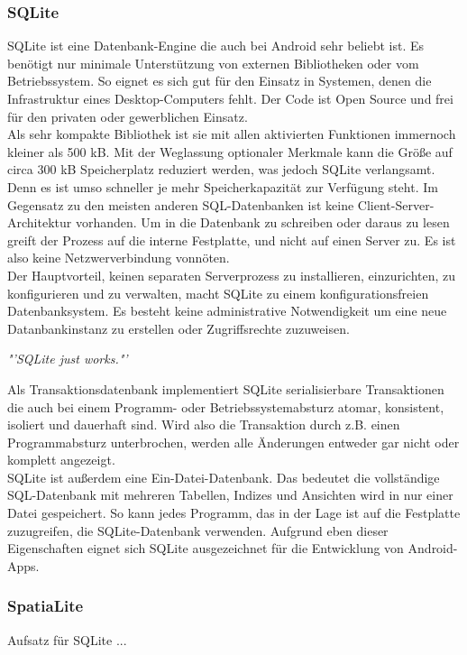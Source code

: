 \subsubsection{SQLite}
SQLite ist eine Datenbank-Engine die auch bei Android sehr beliebt ist. Es benötigt nur minimale Unterstützung von externen Bibliotheken oder vom Betriebssystem. So eignet es sich gut für den Einsatz in Systemen, denen die Infrastruktur eines Desktop-Computers fehlt. Der Code ist Open Source und frei für den privaten oder gewerblichen Einsatz.\\
Als sehr kompakte Bibliothek ist sie mit allen aktivierten Funktionen immernoch kleiner als 500 kB. Mit der Weglassung optionaler Merkmale kann die Größe auf circa 300 kB Speicherplatz reduziert werden, was jedoch SQLite verlangsamt. Denn es ist umso schneller je mehr Speicherkapazität zur Verfügung steht.
Im Gegensatz zu den meisten anderen \gls{SQL}-Datenbanken ist keine Client-Server-Architektur vorhanden. Um in die Datenbank zu schreiben oder daraus zu lesen greift der Prozess auf die interne Festplatte, und nicht auf einen Server zu. Es ist also keine Netzwerverbindung vonnöten. \\
Der Hauptvorteil, keinen separaten Serverprozess zu installieren, einzurichten, zu konfigurieren und zu verwalten, macht SQLite zu einem konfigurationsfreien Datenbanksystem. Es besteht keine administrative Notwendigkeit um eine neue Datanbankinstanz zu erstellen oder Zugriffsrechte zuzuweisen. 
\begin{center}
\textit{\color{gray}"'SQLite just works."'}\hspace{9pt}\cite{sqlitea}
\end{center}
Als Transaktionsdatenbank implementiert SQLite serialisierbare Transaktionen die auch bei einem Programm- oder Betriebssystemabsturz atomar, konsistent, isoliert und dauerhaft sind. Wird also die Transaktion durch z.B. einen Programmabsturz unterbrochen, werden alle Änderungen entweder gar nicht oder komplett angezeigt.\\ 
SQLite ist außerdem eine Ein-Datei-Datenbank. Das bedeutet die vollständige \gls{SQL}-Datenbank mit mehreren Tabellen, Indizes und Ansichten wird in nur einer Datei gespeichert. So kann jedes Programm, das in der Lage ist auf die Festplatte zuzugreifen, die SQLite-Datenbank verwenden. \cite{sqlite} Aufgrund eben dieser Eigenschaften eignet sich SQLite ausgezeichnet für die Entwicklung von Android-\glspl{App}.
\subsubsection{SpatiaLite}
Aufsatz für SQLite ...
